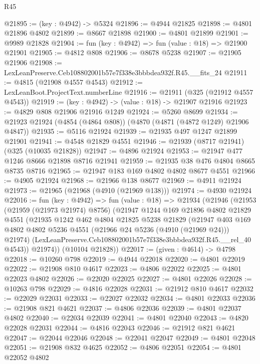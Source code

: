 \begin{lexlean}{R45}
\begin{coremodule}
@21895 := (key : @4942) -> @5324
@21896 := @4944 @21825
@21898 := @4801 @21896 @4802
@21899 := @8667 @21898
@21900 := @4801 @21899
@21901 := @9989 @21828
@21904 := fun (key : @4942) => fun (value : @18) => @21900 @21901
@21905 := @4812 @808
@21906 := @8678 @5238
@21907 := @21905 @21906
@21908 := LexLeanPreserve.Ceb108802001b57e7f338e3bbbdea932f.R45.__fits_24
@21911 := @4815 (@21908 @4557 @4543)
@21912 := LexLeanBoot.ProjectText.numberLine
@21916 := @21911 (@325 (@21912 @4557 @4543))
@21919 := (key : @4942) -> (value : @18) -> @21907 @21916
@21923 := @4829 @808 @21906 @21916 @1249
@21924 := @5260 @8699
@21934 := @21923 @21924 (@4854 (@4864 @808)) (@4870 (@4871 (@4872 @1249) @21906 @4847))
@21935 := @5116 @21924
@21939 := @21935 @497 @1247 @21899 @21901
@21941 := @4548 @21829 @4551
@21946 := @21939 (@8717 @21941) (@325 (@10035 @21828))
@21947 := @4896 @21924
@21953 := @21947 @477 @1246 @8666 @21898 @8716 @21941
@21959 := @21935 @38 @476 @4804 @8665 @8735 @8716
@21965 := @21947 @183 @169 @4802 @4802 @8677 @4551
@21966 := @4905 @21924
@21968 := @21966 @138 @8677
@21969 := @4911 @21924
@21973 := @21965 (@21968 (@4910 (@21969 @138)))
@21974 := @4930 @21924
@22016 := fun (key : @4942) =>
  fun (value : @18) =>
  @21934
    (@21946
      (@21953
        (@21959 (@21973 @21974) @8756)
        (@21947
          @1244
          @169
          @21896
          @4802
          @21829
          @4551
          (@21935
            @1242
            @462
            @4804
            @21825
            @5238
            @21829
            (@21947
              @403
              @169
              @4802
              @4802
              @5236
              @4551
              (@21966 @24 @5236 (@4910 (@21969 @24)))
              @21974)
            (LexLeanPreserve.Ceb108802001b57e7f338e3bbbdea932f.R45.__rel_40 @4543))
          @21974))
      (@10104 @21828))
@22017 := (given : @4614) -> @4798
@22018 := @10260 @798
@22019 := @4944 @22018
@22020 := @4801 @22019
@22022 := @21908 @810 @4617
@22023 := @4806 @22022
@22025 := @4801 @22023 @4802
@22026 := @22020 @22025
@22027 := @4801 @22026
@22028 := @10263 @798
@22029 := @4816 @22028
@22031 := @21912 @810 @4617
@22032 := @22029 @22031
@22033 := @22027 @22032
@22034 := @4801 @22033
@22036 := @21908 @821 @4621
@22037 := @4806 @22036
@22039 := @4801 @22037 @4802
@22040 := @22034 @22039
@22041 := @4801 @22040
@22043 := @4820 @22028 @22031
@22044 := @4816 @22043
@22046 := @21912 @821 @4621
@22047 := @22044 @22046
@22048 := @22041 @22047
@22049 := @4801 @22048
@22051 := @21908 @832 @4625
@22052 := @4806 @22051
@22054 := @4801 @22052 @4802

\end{coremodule}
\end{lexlean}
